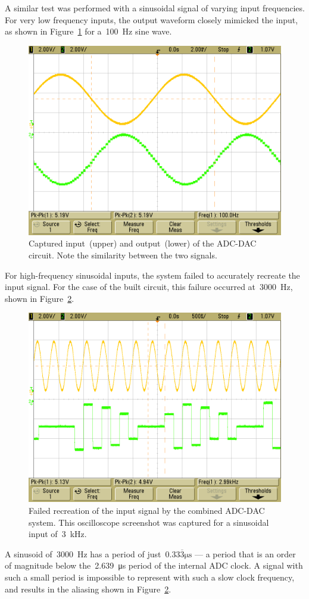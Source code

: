 A similar test was performed with a sinusoidal signal of varying input
frequencies.  For very low frequency inputs, the output waveform closely mimicked
the input, as shown in Figure~\ref{f:100hz} for a~\SI{100}{\hertz} sine wave.
%
\begin{figure}[H]
\centering
	\includegraphics[width=.8\textwidth]{img/shot/sine_100hz.png}
	\parbox{.8\textwidth}{
	\caption[Sinusoidal input --- Low frequency]{Captured input~(upper) and output~(lower) of
	the ADC-DAC circuit.  Note the similarity between the two signals.}
	\label{f:100hz}}
\end{figure}

For high-frequency sinusoidal inputs, the system failed to accurately recreate
the input signal.  For the case of the built circuit, this failure occurred
at~\SI{3000}{\hertz}, shown in Figure~\ref{f:3000hz}.
%
\begin{figure}[H]
\centering
	\includegraphics[width=.8\textwidth]{img/shot/sine_3000hz.png}
	\parbox{.8\textwidth}{
	\caption[Sinusoidal input --- Failure]{Failed recreation of the input
	signal by the combined ADC-DAC system.  This oscilloscope screenshot was
	captured for a sinusoidal input of~\SI{3}{\kilo\hertz}.}
	\label{f:3000hz}}
\end{figure}
%
A sinusoid of~\SI{3000}{\hertz} has a period of
just~$0.33\overline{3}\si{\micro\second}$ --- a period that is an order of
magnitude below the~\SI{2.639}{\micro\second} period of the internal ADC clock.
A signal with such a small period is impossible to represent with such a slow
clock frequency, and results in the aliasing shown in Figure~\ref{f:3000hz}.
